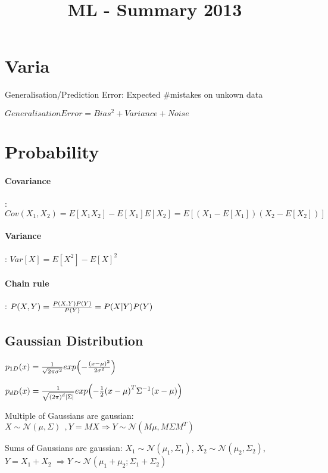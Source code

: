 \documentclass[11pt,twocolumn]{article}
\begin{document}
\title{ML - Summary 2013}



\section{Varia}

Generalisation/Prediction Error: Expected \#mistakes on unkown data


$Generalisation Error = Bias^2 + Variance + Noise$	

\section{Probability}

\paragraph{Covariance}: $Cov(X_1, X_2) = E[X_1 X_2] - E[X_1] E[X_2] = E[(X_1 - E[X_1])(X_2-E[X_2])]$

\paragraph{Variance}: $Var[X] = E[X^2] - E[X]^2$


\paragraph{Chain rule}: $P(X,Y) = {{P(X,Y)P(Y)}\over{P(Y)}} = P(X|Y)P(Y)$



\subsection{Gaussian Distribution}

$p_{1D}(x) = {1 \over {\sqrt{2 \pi \sigma^2}}} exp{\left( -{{\left(x - \mu\right)^2} \over{2 \sigma^2}} \right)}$


$p_{dD}(x) = {1 \over {\sqrt{{(2 \pi)}^d |\Sigma|}}} exp{\left( -{ {1 \over 2}  {\left(x - \mu\right)^T} \Sigma^{-1} {\left(x - \mu\right)}}\right)}$


Multiple of Gaussians are gaussian:
$X \sim  \mathcal{N}(\mu, \Sigma)~~, Y = MX \Rightarrow Y \sim \mathcal{N}(M\mu, M \Sigma M^T)$

Sums of Gaussians are gaussian:
$X_1 \sim \mathcal{N}(\mu_1, \Sigma_1)$,
$X_2 \sim \mathcal{N}(\mu_2, \Sigma_2)$, 
$Y=X_1 + X_2$
$\Rightarrow Y \sim \mathcal{N}(\mu_1 + \mu_2; \Sigma_1+\Sigma_2)$
\end{document}

